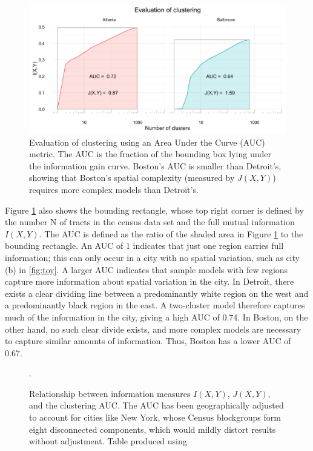 	\begin{figure}
		\centering
		\includegraphics[width=\textwidth]{figs/AUC_illustration.png}
		\caption{Evaluation of clustering using an Area Under the Curve (AUC) metric. The AUC is the fraction of the bounding box lying under the information gain curve. Boston's AUC is smaller than Detroit's, showing that Boston's spatial complexity (measured by $J(X,Y)$) requires more complex models than Detroit's.}
		\label{fig:AUC}
	\end{figure}

	Figure \ref{fig:AUC} also shows the bounding rectangle, whose top right corner is defined by the number N of tracts in the census data set and the full mutual information $I(X,Y)$. The AUC is defined as the ratio of the shaded area in Figure \ref{fig:AUC} to the bounding rectangle. An AUC of 1 indicates that just one region carries full information; this can only occur in a city with no spatial variation, such as city (b) in \ref{fig:toy}. A larger AUC indicates that sample models with few regions capture more information about spatial variation in the city. In Detroit, there exists a clear dividing line between a predominantly white region on the west and a predominantly black region in the east. A two-cluster model therefore captures much of the information in the city, giving a high AUC of 0.74. In Boston, on the other hand, no such clear divide exists, and more complex models are necessary to capture similar amounts of information. Thus, Boston has a lower AUC of 0.67. 

	\begin{figure}
		\centering
		

		\caption{Relationship between information measures $I(X,Y)$, $J(X,Y)$, and the clustering AUC. The AUC has been geographically adjusted to account for cities like New York, whose Census blockgroups form eight disconnected components, which would mildly distort results without adjustment. Table produced using \cite{Marek2015}}.
		\label{fig:info_and_clusters}
	\end{figure}		

